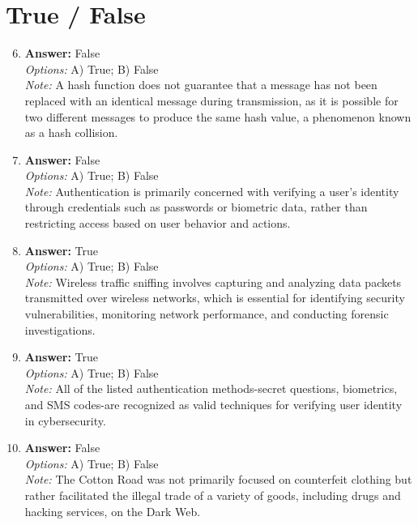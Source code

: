 \documentclass[12pt]{article}
\begin{document}
\section*{True / False}
\begin{enumerate}[label=\arabic*.]
\setcounter{enumi}{5}
\item \textbf{Answer:} False
\\ \textit{Options:} A) True; B) False
\\ \textit{Note:} A hash function does not guarantee that a message has not been replaced with an identical message during transmission, as it is possible for two different messages to produce the same hash value, a phenomenon known as a hash collision.
\item \textbf{Answer:} False
\\ \textit{Options:} A) True; B) False
\\ \textit{Note:} Authentication is primarily concerned with verifying a user's identity through credentials such as passwords or biometric data, rather than restricting access based on user behavior and actions.
\item \textbf{Answer:} True
\\ \textit{Options:} A) True; B) False
\\ \textit{Note:} Wireless traffic sniffing involves capturing and analyzing data packets transmitted over wireless networks, which is essential for identifying security vulnerabilities, monitoring network performance, and conducting forensic investigations.
\item \textbf{Answer:} True
\\ \textit{Options:} A) True; B) False
\\ \textit{Note:} All of the listed authentication methods-secret questions, biometrics, and SMS codes-are recognized as valid techniques for verifying user identity in cybersecurity.
\item \textbf{Answer:} False
\\ \textit{Options:} A) True; B) False
\\ \textit{Note:} The Cotton Road was not primarily focused on counterfeit clothing but rather facilitated the illegal trade of a variety of goods, including drugs and hacking services, on the Dark Web.
\end{enumerate}
\end{document}
